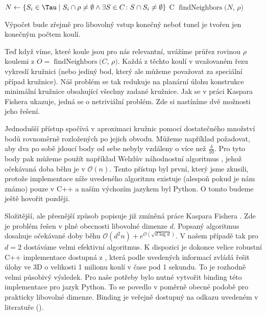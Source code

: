 \begin{algorithmic}[1]
\label{alg:findNeighbors}

    \State $ N \gets \{ S_i \in \Tau \mid S_i \cap \rho \neq \emptyset
        \wedge \exists S \in C \colon S \cap S_i \neq \emptyset \} $
        \State \Return C
    \Else
        \State \Return $\operatorname{findNeighbors}(N$, $\rho)$
    \EndIf
\EndFunction

\end{algorithmic}

Výpočet bude zřejmě pro libovolný vstup konečný neboť tunel je tvořen jen konečným
počtem koulí.

Teď když víme, které koule jsou pro nás relevantní, uvážíme průřez rovinou
$ \rho $ koulemi z $ O = \operatorname{findNeighbors}(C$, $\rho)$.
Každá z těchto koulí v uvažovaném řezu vykreslí
kružnici (nebo jediný bod, který ale můžeme považovat za speciální případ kružnice).
Náš problém se tak redukuje na planární úlohu konstrukce minimální kružnice obsahující
všechny zadané kružnice. Jak se v práci Kaspara Fishera \cite{FisherBalls} ukazuje,
jedná se o netriviální problém. Zde si nastíníme dvě možnosti jeho řešení.

Jednodušší přístup spočívá v aproximaci kružnic pomocí dostatečného množství bodů
rovnoměrně rozložených po jejich obvodu. Můžeme například požadovat, aby dva
po sobě jdoucí body od sebe nebyly vzdáleny o více než $ \frac{\delta}{10} $.
Pro tyto body pak můžeme použít například Welzlův náhodnostní algoritmus
\cite{WelzlRandom}, jehož očekávaná doba běhu je v $ \mathcal{O}(n) $. Tento
přístup byl první, který jsme zkusili, protože implementace níže uvedeného algoritmu
existuje (alespoň pokud je nám známo) pouze v C++ a naším výchozím jazykem byl
Python. O tomto budeme ještě hovořit později.

Složitější, ale přesnější způsob popisuje již zmíněná práce Kaspara Fishera
\cite{FisherBalls}. Zde je problém řešen v plné obecnosti libovolné dimenze $ d $.
Popsaný algoritmus dosahuje očekávané doby běhu
$ \mathcal{O}(d^2n) + e^{\mathcal{O}(\sqrt{d \log{d}})} $. V našem případě tak pro
$ d = 2 $ dostáváme velmi efektivní algoritmus. K dispozici je dokonce velice
robustní C++ implementace dostupná z \cite{cpp_balls}, která podle uvedených informací
zvládá řešit úlohy ve 3D o velikosti 1 milionu koulí v čase pod 1 sekundu. To
je rozhodně velmi působivý výsledek. Pro naše potřeby bylo nutné vytvořit
binding této implementace pro jazyk Python. To se povedlo v poměrně obecné
podobě pro prakticky libovolné dimenze. Binding je veřejně dostupný na odkazu
uvedeném v literatuře (\cite{python_balls}).

